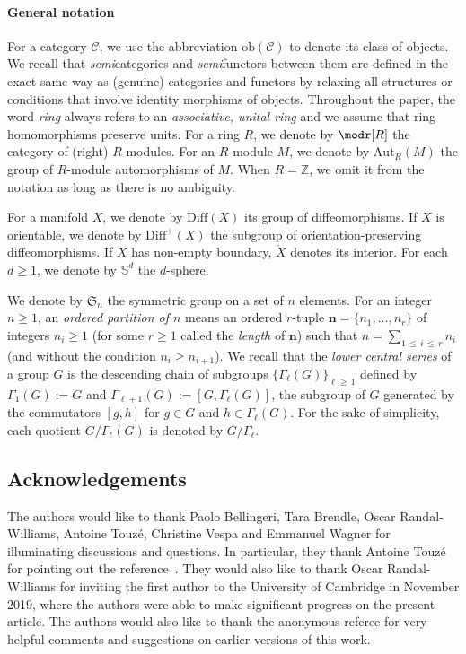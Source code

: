 \documentclass[AHL,Unicode,published]{cedram}
\newcommand{\Diff}{\mathrm{Diff}}
\newcommand{\Aut}{\mathrm{Aut}}
\newcommand{\obj}{\ensuremath{\mathrm{ob}}}
\newcommand{\Int}{\mathring}
\newcommand{\bn}{\mathbf{n}}
\newcommand{\LCS}{\varGamma}
\newcommand{\Sym}{\mathfrak{S}}
\newcommand{\cC}{\mathcal{C}}
\newcommand{\bS}{\mathbb{S}}
\newcommand{\bZ}{\mathbb{Z}}
\renewcommand{\geq}{\geqslant}
\renewcommand{\leq}{\leqslant}
\begin{document}
\paragraph*{General notation}
For a category $\cC$, we use the abbreviation $\obj(\cC)$ to denote its class of objects. We recall that \emph{semi}categories and \emph{semi}functors between them are defined in the exact same way as (genuine) categories and functors by relaxing all structures or conditions that involve identity morphisms of objects. Throughout the paper, the word \emph{ring} always refers to an \emph{associative, unital ring} and we assume that ring homomorphisms preserve units. For a ring $R$, we denote by $\modr[R]$ the category of (right) $R$-modules. For an $R$-module $M$, we denote by $\Aut_{R}(M)$ the group of $R$-module automorphisms of $M$. When $R=\bZ$, we omit it from the notation as long as there is no ambiguity.

For a manifold $X$, we denote by $\Diff(X)$ its group of diffeomorphisms. If $X$ is orientable, we denote by $\Diff^{+}(X)$ the subgroup of orientation-preserving diffeomorphisms. If $X$ has non-empty boundary, $\Int{X}$ denotes its interior. For each $d\geq 1$, we denote by $\bS^{d}$ the $d$-sphere.

We denote by $\Sym_{n}$ the symmetric group on a set of $n$ elements. For an integer $n \geq 1$, an \emph{ordered partition of $n$} means an ordered $r$-tuple $\bn = \boldsymbol{\{} n_{1}, \ldots, n_r\boldsymbol{\}}$ of integers $n_{i} \geq 1$ (for some $r \geq 1$ called the \emph{length} of $\bn$) such that $n = \sum_{1\,\leq\,i\,\leq\,r} n_{i}$ (and without the condition $n_{i}\geq n_{i+1}$). We recall that the \emph{lower central series} of a group $G$ is the descending chain of subgroups $\{ \LCS_{\ell}(G)\} _{\ell\geq\,1}$ defined by $\LCS_{1}(G):=G$ and $\LCS_{\ell + 1}(G):=[G,\LCS_{\ell}(G)]$, the subgroup of $G$ generated by the commutators $[g,h]$ for $g \in G$ and $h \in \LCS_{\ell}(G)$. For the sake of simplicity, each quotient $G/\LCS_{\ell}(G)$ is denoted by $G/\LCS_{\ell}$.


\subsection*{Acknowledgements}

The authors would like to thank Paolo Bellingeri, Tara Brendle, Oscar Randal-Williams, Antoine Touzé, Christine Vespa and Emmanuel Wagner for illuminating discussions and questions. In particular, they thank Antoine Touzé for pointing out the reference~\cite{ErdmannNakano}. They would also like to thank Oscar Randal-Williams for inviting the first author to the University of Cambridge in November 2019, where the authors were able to make significant progress on the present article. The authors would also like to thank the anonymous referee for very helpful comments and suggestions on earlier versions of this work.
\end{document}

